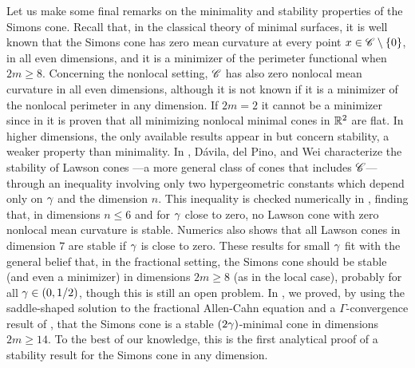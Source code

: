 Let us make some final remarks on the minimality and stability properties of the Simons cone. Recall that, in the classical theory of minimal surfaces, it is well known that the Simons cone has zero mean curvature at every point $x\in \mathscr{C} \setminus \{0\}$, in all even dimensions, and it is a minimizer of the perimeter functional when $2m\geq 8$. Concerning the nonlocal setting, $\mathscr{C}$ has also zero nonlocal mean curvature in all even dimensions, although it is not known if it is a minimizer of the nonlocal perimeter in any dimension. If $2m=2$ it cannot be a minimizer since in \cite{SavinValdinoci-Cones} it is proven that all minimizing nonlocal minimal cones in $\mathbb{R}^2$ are flat. In higher dimensions, the only available results appear in \cite{DaviladelPinoWei, Felipe-Sanz-Perela:SaddleFractional} but concern stability, a weaker property than minimality. In \cite{DaviladelPinoWei},  Dávila, del Pino, and Wei characterize the stability of Lawson cones ---a more general class of cones that includes $\mathscr{C}$--- through an inequality involving only two hypergeometric constants which depend only on $\gamma$ and the dimension $n$. This inequality is checked numerically in \cite{DaviladelPinoWei}, finding that, in dimensions $n \leq 6$ and for $\gamma$ close to zero, no Lawson cone with zero nonlocal mean curvature is stable. Numerics also shows that all Lawson cones in dimension $7$ are stable if $\gamma$ is close to zero. These results for small $\gamma$ fit with the general belief that, in the fractional setting, the Simons cone should be stable (and even a minimizer) in dimensions $2m \geq 8$ (as in the local case), probably for all $\gamma\in(0,1/2)$, though this is still an open problem. In \cite{Felipe-Sanz-Perela:SaddleFractional}, we proved, by using the saddle-shaped solution to the fractional Allen-Cahn equation and a $\Gamma$-convergence result of \cite{CabreCintiSerra-Stable}, that the Simons cone is a stable $(2\gamma)$-minimal cone in dimensions $2m\geq 14$. To the best of our knowledge, this is the first analytical proof of a stability result for the Simons cone in any dimension.



